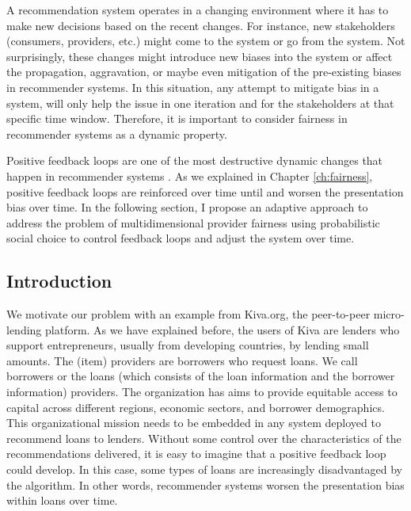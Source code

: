 \label{sec:dynamicfair}

A recommendation system operates in a changing environment where it has to make new decisions based on the recent changes. For instance, new stakeholders (consumers, providers, etc.) might come to the system or go from the system. Not surprisingly, these changes might introduce new biases into the system or affect the propagation, aggravation, or maybe even mitigation of the pre-existing biases in recommender systems. In this situation, any attempt to mitigate bias in a system, will only help the issue in one iteration and for the stakeholders at that specific time window. Therefore, it is important to consider fairness in recommender systems as a dynamic property.

Positive feedback loops are one of the most destructive dynamic changes that happen in recommender systems \cite{o2016weapons}. As we explained in Chapter \ref{ch:fairness}, positive feedback loops are reinforced over time until and worsen the presentation bias over time. In the following section, I propose an adaptive approach to address the problem of multidimensional provider fairness using probabilistic social choice to control feedback loops and adjust the system over time.

\subsection{Introduction}
\label{subsec:dyn_intro}

We motivate our problem with an example from Kiva.org, the peer-to-peer micro-lending platform. As we have explained before, the users of Kiva are lenders who support entrepreneurs, usually from developing countries, by lending small amounts. The (item) providers are borrowers who request loans. We call borrowers or the loans (which consists of the loan information and the borrower information) providers. The organization has aims to provide equitable access to capital across different regions, economic sectors, and borrower demographics. This organizational mission needs to be embedded in any system deployed to recommend loans to lenders. Without some control over the characteristics of the recommendations delivered, it is easy to imagine that a positive feedback loop \cite{sun2019debiasing} could develop. In this case, some types of loans are increasingly disadvantaged by the algorithm. In other words, recommender systems worsen the presentation bias within loans over time.

